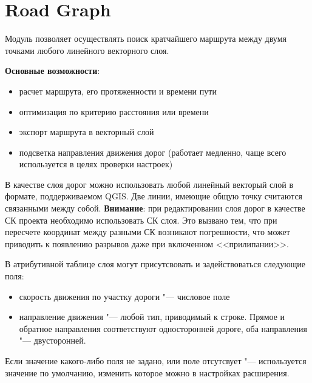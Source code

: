 
\section{Road Graph}\label{sec:roadgraph}



Модуль  позволяет осуществлять поиск кратчайшего
маршрута между двумя точками любого линейного векторного слоя.

\textbf{Основные возможности}:

\begin{itemize}
\item расчет маршрута, его протяженности и времени пути
\item оптимизация по критерию расстояния или времени
\item экспорт маршрута в векторный слой
\item подсветка направления движения дорог (работает медленно, чаще всего
используется в целях проверки настроек)
\end{itemize}

В качестве слоя дорог можно использовать любой линейный векторый слой в
формате, поддерживаемом QGIS. Две линии, имеющие общую точку считаются
связанными между собой. \textbf{Внимание}: при редактировании слоя дорог
в качестве СК проекта необходимо использовать СК слоя. Это вызвано тем,
что при пересчете координат между разными СК возникают погрешности, что
может приводить к появлению разрывов даже при включенном <<прилипании>>.

В атрибутивной таблице слоя могут присутсвовать и задействоваться следующие
поля:

\begin{itemize}
\item скорость движения по участку дороги "--- числовое поле
\item направление движения "--- любой тип, приводимый к строке. Прямое и
обратное направления соответствуют односторонней дороге, оба направления "---
двусторонней.
\end{itemize}

Если значение какого-либо поля не задано, или поле отсутсвует "--- используется
значение по умолчанию, изменить которое можно в настройках расширения.


